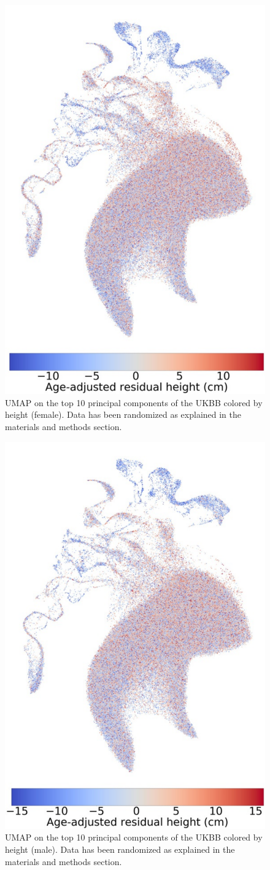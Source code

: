 \documentclass[12pt]{pnas-new}
\begin{document}
\begin{figure}
    \centering
    \includegraphics[width=0.4\columnwidth]{images/UKBB_UMAP_PC10_NN15_MD05_2018328174511_2018714161841_Height_res_pct1_f.pdf}
    \caption{UMAP on the top 10 principal components of the UKBB colored by height (female). Data has been randomized as explained in the materials and methods section.}
    \label{fig:supp_ukbb_height_f}
\end{figure}

\begin{figure}
    \centering
    \includegraphics[width=0.4\columnwidth]{images/UKBB_UMAP_PC10_NN15_MD05_2018328174511_2018714161841_Height_res_pct1_m.pdf}
    \caption{UMAP on the top 10 principal components of the UKBB colored by height (male). Data has been randomized as explained in the materials and methods section.}
    \label{fig:supp_ukbb_height_m}
\end{figure}
\end{document}

